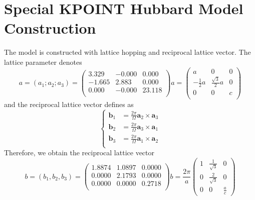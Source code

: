 \documentclass[reprint, aps, prb, showkeys]{revtex4-2}
\begin{document}
\section{Special KPOINT Hubbard Model Construction}
The model is constructed with lattice hopping and reciprocal lattice vector. The lattice parameter denotes
\begin{subequations}
\begin{equation}
    a = (a_1; a_2; a_3) =
    \begin{pmatrix}
        3.329   &-0.000   & 0.000 \\
        -1.665  &  2.883  & 0.000\\
         0.000  & -0.000  & 23.118 \\
    \end{pmatrix}
\end{equation}
\begin{equation}
    a =
    \begin{pmatrix}
        a   &0   & 0 \\
        -\frac{1}{2}a  &  \frac{\sqrt{3}}{2}a  & 0\\
         0  & 0  & c \\
    \end{pmatrix}
\end{equation}
\end{subequations}
and the reciprocal lattice vector defines as
\begin{equation}
    \begin{cases}
        \boldsymbol{b}_1 &= \frac{2\pi}{\Omega} \boldsymbol{a}_2 \times \boldsymbol{a}_3 \\
        \boldsymbol{b}_2 &= \frac{2\pi}{\Omega} \boldsymbol{a}_3 \times \boldsymbol{a}_1 \\
        \boldsymbol{b}_3 &= \frac{2\pi}{\Omega} \boldsymbol{a}_1 \times \boldsymbol{a}_2 \\
    \end{cases}
\end{equation}
Therefore, we obtain the reciprocal lattice vector
\begin{subequations}
\begin{equation}
    b = (b_1, b_2, b_3) = 
    \begin{pmatrix}
        1.8874  &  1.0897  &  0.0000 \\
        0.0000  &  2.1793  &  0.0000 \\
        0.0000  &  0.0000  &  0.2718 \\
    \end{pmatrix}   
\end{equation}

\begin{equation}
    b = \frac{2\pi}{a}
    \begin{pmatrix}
        1 & \frac{1}{\sqrt{3}} & 0 \\
        0 & \frac{2}{\sqrt{3}} & 0 \\
        0 & 0 & \frac{a}{c}
    \end{pmatrix}
\end{equation}
\end{subequations}
\end{document}
